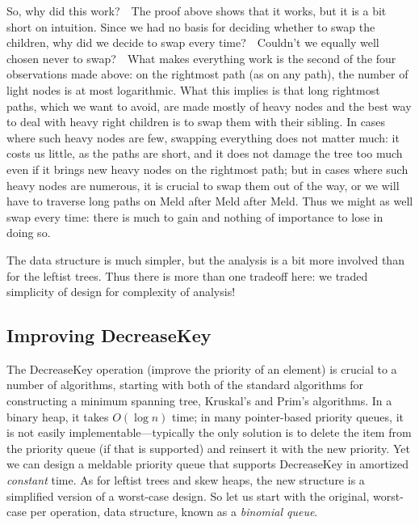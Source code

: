 \documentclass[11pt]{article}
\begin{document}
So, why did this work?\ \ The proof above shows that it works, but it is
a bit short on intuition.  Since we had no basis for deciding whether to
swap the children, why did we decide to swap every time?\ \ Couldn't we
equally well chosen never to swap?\ \ What makes everything work is the 
second of the four observations made above: on the rightmost path (as
on any path), the number of light nodes is at most logarithmic.  What
this implies is that long rightmost paths, which we want to avoid,
are made mostly of heavy nodes and the best way to deal with heavy
right children is to swap them with their sibling.   In cases where
such heavy nodes are few, swapping everything does not matter much:
it costs us little, as the paths are short, and it does not damage
the tree too much even if it brings new heavy nodes on the rightmost
path; but in cases where such heavy nodes are numerous, it is crucial
to swap them out of the way, or we will have to traverse long paths
on Meld after Meld after Meld.  Thus we might as well swap every time:
there is much to gain and nothing of importance to lose in doing so.

The data structure is much simpler, but the analysis is a bit more involved
than for the leftist trees.  Thus there is more than one tradeoff here:
we traded simplicity of design for complexity of analysis!

\subsection{Improving DecreaseKey}
The DecreaseKey operation (improve the priority of an element) is crucial
to a number of algorithms, starting with both of the standard algorithms
for constructing a minimum spanning tree, Kruskal's and Prim's algorithms.
In a binary heap, it takes $O(\log n)$ time; in many pointer-based priority
queues, it is not easily implementable---typically the only solution is to
delete the item from the priority queue (if that is supported) and reinsert
it with the new priority.  Yet we can design a meldable priority queue that
supports DecreaseKey in amortized \emph{constant} time.   As for leftist
trees and skew heaps, the new structure is a simplified version of a worst-case
design.  So let us start with the original, worst-case per operation, data
structure, known as a \emph{binomial queue}.
\end{document}

